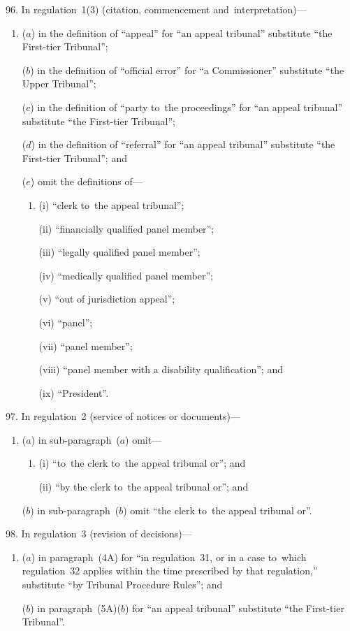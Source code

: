 \documentclass[12pt,a4paper]{article}
\begin{document}
\medskip

96.  In regulation~1(3) (citation, commencement and~interpretation)—
\begin{enumerate}\item[]
($a$) in the definition of “appeal” for “an appeal tribunal” substitute “the First-tier Tribunal”;

($b$) in the definition of “official error” for “a Commissioner” substitute “the Upper Tribunal”;

($c$) in the definition of “party to~the proceedings” for “an appeal tribunal” substitute “the First-tier Tribunal”;

($d$) in the definition of “referral” for “an appeal tribunal” substitute “the First-tier Tribunal”; and

($e$) omit the definitions of—
\begin{enumerate}\item[]
(i) “clerk to~the appeal tribunal”;

(ii) “financially qualified panel member”;

(iii) “legally qualified panel member”;

(iv) “medically qualified panel member”;

(v) “out of jurisdiction appeal”;

(vi) “panel”;

(vii) “panel member”;

(viii) “panel member with a disability qualification”; and

(ix) “President”.
\end{enumerate}
\end{enumerate}

\medskip

97.  In regulation~2 (service of notices or documents)—
\begin{enumerate}\item[]
($a$) in sub-paragraph~($a$)  omit—
\begin{enumerate}\item[]
(i) “to~the clerk to~the appeal tribunal or”; and

(ii) “by the clerk to~the appeal tribunal or”; and
\end{enumerate}

($b$) in sub-paragraph~($b$)  omit “the clerk to~the appeal tribunal or”.
\end{enumerate}

\medskip

98.  In regulation~3 (revision of decisions)—
\begin{enumerate}\item[]
($a$) in paragraph~(4A) for “in regulation~31, or in a case to~which regulation~32 applies within the time prescribed by that regulation,” substitute “by Tribunal Procedure Rules”; and

($b$) in paragraph~(5A)($b$)  for “an appeal tribunal” substitute “the First-tier Tribunal”.
\end{enumerate}
\end{document}
